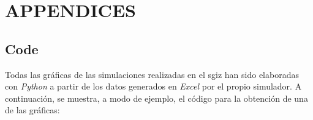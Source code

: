 
\newpage
\section*{APPENDICES} \label{sec:appendices} %
{} %

\renewcommand{\thesubsection}{\Alph{subsection}} %
\renewcommand{\thetable}{\Alph{subsection}.\arabic{table}}
\renewcommand{\thefigure}{\Alph{subsection}.\arabic{figure}}
\renewcommand{\thecode}{\Alph{subsection}.\arabic{code}}

\setcounter{subsection}{0}
\setcounter{table}{0}
\setcounter{figure}{0}

\subsection{Code} \label{sec:code}

Todas las gráficas de las simulaciones realizadas en el \acrshort{sgiz} han sido elaboradas con \textit{Python} a partir de los datos generados en \textit{Excel} por el propio simulador. A continuación, se muestra, a modo de ejemplo, el código para la obtención de una de las gráficas:

\vspace{-5pt}

